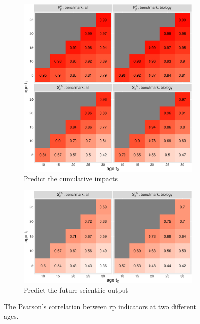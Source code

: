 \begin{figure}[ht!]
    \centering
    \begin{subfigure}[b]{0.8\textwidth}
        \centering
             \includegraphics[width=\textwidth]{figures/pred_power/current/heatmap_cor.eps}
         \caption{Predict the cumulative impacts}
         \label{fig:hm_rp_current}
    \end{subfigure}
    
    \begin{subfigure}[b]{0.8\textwidth}
        \centering
             \includegraphics[width=\textwidth]{figures/pred_power/future/heatmap_cor.eps}
         \caption{Predict the future scientific output}
         \label{fig:hm_rp_future}
    \end{subfigure}
    \caption{The Pearson's correlation between rp indicators at two different ages. }
    \label{fig:hm_rp}
\end{figure}
